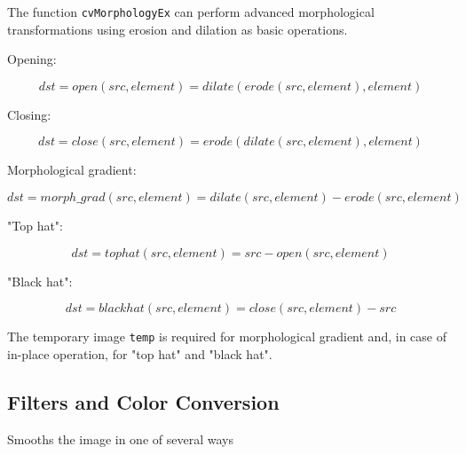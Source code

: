 \begin{description}
\begin{description}
\end{description}
\end{description}

The function \texttt{cvMorphologyEx} can perform advanced morphological transformations using erosion and dilation as basic operations.

Opening:

\[
dst=open(src,element)=dilate(erode(src,element),element)
\]

Closing:

\[
dst=close(src,element)=erode(dilate(src,element),element)
\]

Morphological gradient:

\[
dst=morph\_grad(src,element)=dilate(src,element)-erode(src,element)
\]

"Top hat":

\[
dst=tophat(src,element)=src-open(src,element)
\]

"Black hat":

\[
dst=blackhat(src,element)=close(src,element)-src
\]

The temporary image \texttt{temp} is required for morphological gradient and, in case of in-place operation, for "top hat" and "black hat".

\subsection{Filters and Color Conversion}

\label{Smooth}

Smooths the image in one of several ways


